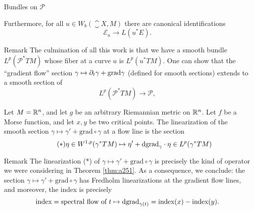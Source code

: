 \documentclass{amsart}
\begin{document}
\begin{clear}{Bundles on $\mathscr{P}$}
\begin{thm}
  Furthermore, for all $u\in W_{b}(\closure{X},M)$ there are canonical identifications
  \begin{equation*}
    \mathscr{E}_{u}\to L(u^{*}E).
  \end{equation*}
\end{thm}
\begin{clear}{Remark}
  The culmination of all this work is that we have a smooth bundle
  $L^{p}(\mathscr{P}^{*}TM)$ whose fiber at a curve $u$ is
  $L^{p}(u^{*}TM)$. One can show that the ``gradient flow'' section
  $\gamma\mapsto \partial_{t} \gamma+\text{grad}\gamma$ (defined for smooth
  sections) extends to a smooth section of
  \begin{equation*}
    L^{p}(\mathscr{P}^{*}TM)\to \mathscr{P},
  \end{equation*}  
\end{clear}
\begin{prop}
  Let $M=\mathbb{R}^{n}$, and let $g$ be an arbitrary Riemannian metric on
  $\mathbb{R}^{n}$. Let $f$ be a Morse function, and let $x,y$ be two critical
  points. The linearization of the smooth section $\gamma\mapsto
  \gamma'+\text{grad}\circ \gamma$ at a flow line is the section
  \begin{equation*}\tag{$\ast$}
    \eta\in W^{1,p}(\gamma^{*}TM)\mapsto
    \eta'+\mathrm{d}\text{grad}_{\gamma}\cdot \eta\in L^{p}(\gamma^{*}TM)
  \end{equation*}
\end{prop}
\begin{clear}{Remark}
  The linearization ($\ast$) of
  $\gamma\mapsto \gamma'+\text{grad}\circ \gamma$ is precisely the
  kind of operator we were considering in Theorem \ref{thm:a251}. As a
  consequence, we conclude: the section $\gamma\mapsto
  \gamma'+\text{grad}\circ \gamma$ has Fredholm linearizations at the
  gradient flow lines, and moreover, the index is precisely
  \begin{equation*}
    \text{index}=\text{spectral flow of $t\mapsto \mathrm{d}\mathrm{grad}_{\gamma(t)}$}=\text{index}(x)-\text{index}(y).
  \end{equation*}
\end{clear}
\end{clear}
\end{document}
